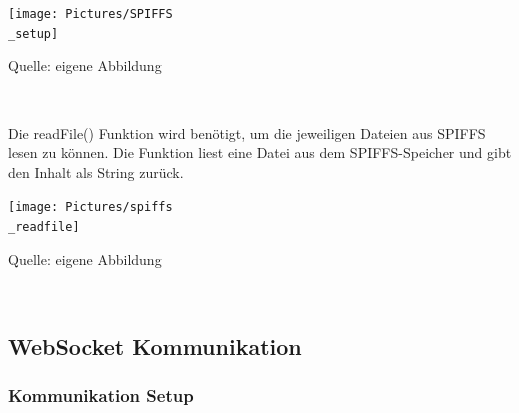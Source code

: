 \documentclass[ngerman,12pt,a4paper]{article}
\begin{document}
	\begin{center}
		\begin{minipage}[t]{0.75\textwidth}
			\texttt{[image: Pictures/SPIFFS\\\_setup]}
			\label{fig:spiffs_init}
			\vspace{-10pt}
			\begin{center}
				\par\small Quelle: eigene Abbildung
			\end{center}
		\end{minipage} \\[2cm]
	\end{center}
	Die readFile() Funktion wird benötigt, um die jeweiligen Dateien aus SPIFFS lesen zu können. Die Funktion liest eine Datei aus dem SPIFFS-Speicher und gibt den Inhalt als String zurück.\\
	
	\begin{center}
		\begin{minipage}[t]{0.75\textwidth}
			\texttt{[image: Pictures/spiffs\\\_readfile]}
			\label{fig:spiffs_readfile}
			\vspace{-10pt}
			\begin{center}
				\par\small Quelle: eigene Abbildung
			\end{center}
		\end{minipage} \\[0.75cm]
	\end{center}

	
		\subsection{WebSocket Kommunikation}
		
			\subsubsection{Kommunikation Setup}	
			
\end{document}
